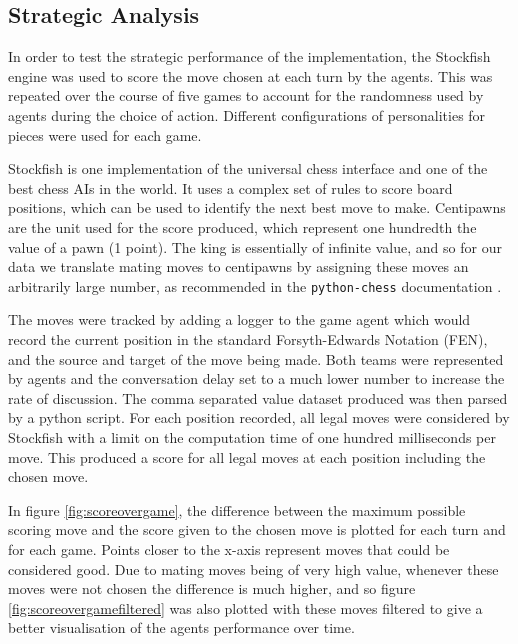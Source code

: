 \documentclass{article}
\begin{document}
\subsection{Strategic Analysis}

In order to test the strategic performance of the implementation, the Stockfish engine \cite{stockfish} was used to score the move chosen at each turn by the agents. This was repeated over the course of five games to account for the randomness used by agents during the choice of action. Different configurations of personalities for pieces were used for each game.

Stockfish is one implementation of the universal chess interface and one of the best chess AIs in the world. It uses a complex set of rules to score board positions, which can be used to identify the next best move to make. Centipawns are the unit used for the score produced, which represent one hundredth the value of a pawn (1 point). The king is essentially of infinite value, and so for our data we translate mating moves to centipawns by assigning these moves an arbitrarily large number, as recommended in the \lstinline{python-chess} documentation \cite{pythonchess}. 

The moves were tracked by adding a logger to the game agent which would record the current position in the standard Forsyth-Edwards Notation (FEN), and the source and target of the move being made. Both teams were represented by agents and the conversation delay set to a much lower number to increase the rate of discussion. The comma separated value dataset produced was then parsed by a python script. For each position recorded, all legal moves were considered by Stockfish with a limit on the computation time of one hundred milliseconds per move. This produced a score for all legal moves at each position including the chosen move.

In figure \ref{fig:scoreovergame}, the difference between the maximum possible scoring move and the score given to the chosen move is plotted for each turn and for each game. Points closer to the x-axis represent moves that could be considered good. Due to mating moves being of very high value, whenever these moves were not chosen the difference is much higher, and so figure \ref{fig:scoreovergamefiltered} was also plotted with these moves filtered to give a better visualisation of the agents performance over time.
\end{document}
